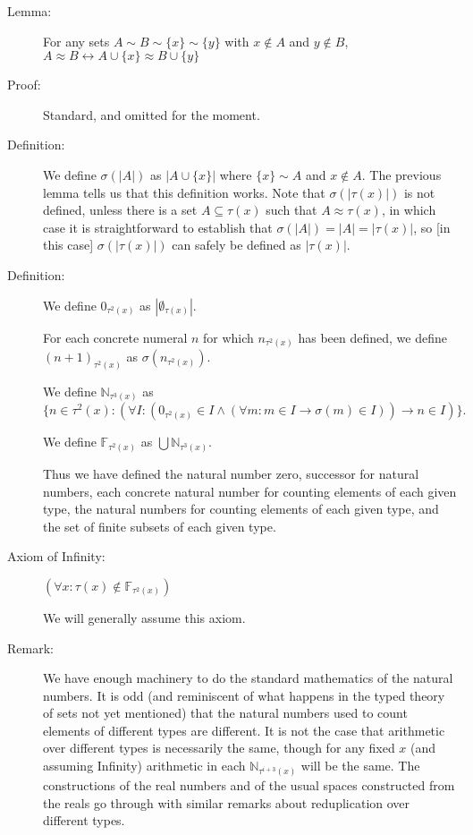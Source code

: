 \documentclass[12pt]{article}
\begin{document}
\begin{description}
\item[Lemma:]  For any sets $A\sim B \sim \{x\} \sim \{y\}$ with $x \not\in A$ and $y \not\in B$, $A \approx B \leftrightarrow A \cup \{x\} \approx B \cup\{y\}$

\item[Proof:]  Standard, and omitted for the moment.

\item[Definition:]  We define $\sigma(|A|)$ as $|A \cup \{x\}|$ where $\{x\} \sim A$ and $x \not\in A$.  The previous lemma tells us that this definition works.  Note that $\sigma(|\tau(x)|)$ is not defined, unless there is a set $A \subseteq \tau(x)$ such that $A \approx \tau(x)$, in which case it is straightforward to establish that $\sigma(|A|) = |A| = |\tau(x)|$, so [in this case] $\sigma(|\tau(x)|)$ can safely be defined as $|\tau(x)|$.

\item[Definition:]  We define $0_{\tau^2(x)}$ as $|\emptyset_{\tau(x)}|$.  

For each concrete numeral $n$ for which $n_{\tau^2(x)}$ has been defined,
we define $(n+1)_{\tau^2(x)}$ as $\sigma(n_{\tau^2(x)})$.

We define ${\mathbb N}_{\tau^3(x)}$ as $$\{n \in \tau^2(x):(\forall I:(0_{\tau^2(x)} \in I \wedge (\forall m:m \in I \rightarrow \sigma(m) \in I)) \rightarrow n \in I)\}.$$

We define ${\mathbb F}_{\tau^2(x)}$ as $\bigcup {\mathbb N}_{\tau^3(x)}$.

Thus we have defined the natural number zero, successor for natural numbers, each concrete natural number for counting elements of each given type,
the natural numbers for counting elements of each given type, and the set of finite subsets of each given type.

\item[Axiom of Infinity:]  $(\forall x:\tau(x) \not\in {\mathbb F}_{\tau^2(x)})$

We will generally assume this axiom.

\item[Remark:]  We have enough machinery to do the standard mathematics of the natural numbers.  It is odd (and reminiscent of what happens in the typed theory of sets not yet mentioned) that the natural numbers used to count elements of different types are different.  It is not the case that arithmetic over different types is necessarily the same, though for any fixed $x$ (and assuming Infinity) arithmetic in each ${\mathbb N}_{\tau^{i+3}(x)}$ will be the same.  The constructions of the real numbers and of the usual spaces constructed from the reals go through with similar remarks about reduplication over different types.


\end{description}
\end{document}
